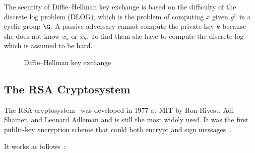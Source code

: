 The security of Diffie–Hellman key exchange is based on the difficulty of the discrete log problem (DLOG), which is the problem of computing $x$ given $g^{x}$ in a cyclic group $\G$. A passive adversary cannot compute the private key $k$ because she does not know $x_a$ or $x_b$. To find them she have to compute the discrete log which is assumed to be hard.

\begin{figure}[!hb]
  \centering
  \caption{Diffie–Hellman key exchange}
  \label{fig:crypto:dh}
\end{figure}

\subsection{The RSA Cryptosystem}
\label{preliminaries:pub:rsa}

The RSA cryptosystem~\cite{rsa} was developed in 1977 at MIT by Ron Rivest, Adi Shamer, and Leonard Adleman and is still the most widely used. It was the first public-key encryption scheme that could both encrypt and sign messages~\cite{kiagias:crypto}.

It works as follows~\cite{Katz:2014:IMC:2700550, kiagias:crypto}:

